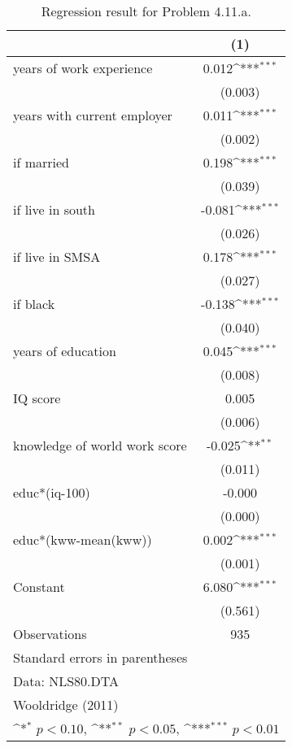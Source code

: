 \begin{table}[htbp]\centering
\def\sym#1{\ifmmode^{#1}\else\(^{#1}\)\fi}
\caption{Regression result for Problem 4.11.a. \label{reg1}}
\begin{tabular}{l*{1}{c}}
\toprule
                    &\multicolumn{1}{c}{(1)}         \\
\midrule
years of work experience&       0.012\sym{***}\\
                    &     (0.003)         \\
\addlinespace
years with current employer&       0.011\sym{***}\\
                    &     (0.002)         \\
\addlinespace
=1 if married       &       0.198\sym{***}\\
                    &     (0.039)         \\
\addlinespace
=1 if live in south &      -0.081\sym{***}\\
                    &     (0.026)         \\
\addlinespace
=1 if live in SMSA  &       0.178\sym{***}\\
                    &     (0.027)         \\
\addlinespace
=1 if black         &      -0.138\sym{***}\\
                    &     (0.040)         \\
\addlinespace
years of education  &       0.045\sym{***}\\
                    &     (0.008)         \\
\addlinespace
IQ score            &       0.005         \\
                    &     (0.006)         \\
\addlinespace
knowledge of world work score&      -0.025\sym{**} \\
                    &     (0.011)         \\
\addlinespace
educ*(iq-100)       &      -0.000         \\
                    &     (0.000)         \\
\addlinespace
educ*(kww-mean(kww))&       0.002\sym{***}\\
                    &     (0.001)         \\
\addlinespace
Constant            &       6.080\sym{***}\\
                    &     (0.561)         \\
\midrule
Observations        &         935         \\
\bottomrule
\multicolumn{2}{l}{\footnotesize Standard errors in parentheses}\\
\multicolumn{2}{l}{\footnotesize Data: NLS80.DTA}\\
\multicolumn{2}{l}{\footnotesize Wooldridge (2011)}\\
\multicolumn{2}{l}{\footnotesize \sym{*} \(p<0.10\), \sym{**} \(p<0.05\), \sym{***} \(p<0.01\)}\\
\end{tabular}
\end{table}

